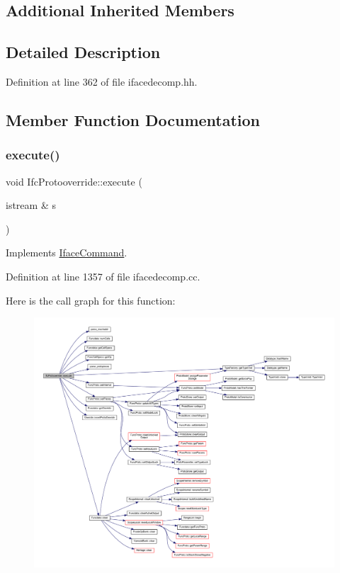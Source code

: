 \subsection*{Additional Inherited Members}


\subsection{Detailed Description}


Definition at line 362 of file ifacedecomp.\+hh.



\subsection{Member Function Documentation}
\mbox{\label{class_ifc_protooverride_adf9d52b83faac64aae4fb2e27890755c}} 
\subsubsection{\texorpdfstring{execute()}{execute()}}
{\footnotesize\ttfamily void Ifc\+Protooverride\+::execute (\begin{DoxyParamCaption}\item[{istream \&}]{s }\end{DoxyParamCaption})\hspace{0.3cm}{\ttfamily [virtual]}}



Implements \mbox{\hyperlink{class_iface_command_af10e29cee2c8e419de6efe9e680ad201}{Iface\+Command}}.



Definition at line 1357 of file ifacedecomp.\+cc.

Here is the call graph for this function\+:
\nopagebreak
\begin{figure}[H]
\begin{center}
\leavevmode
\includegraphics[width=350pt]{class_ifc_protooverride_adf9d52b83faac64aae4fb2e27890755c_cgraph}
\end{center}
\end{figure}


